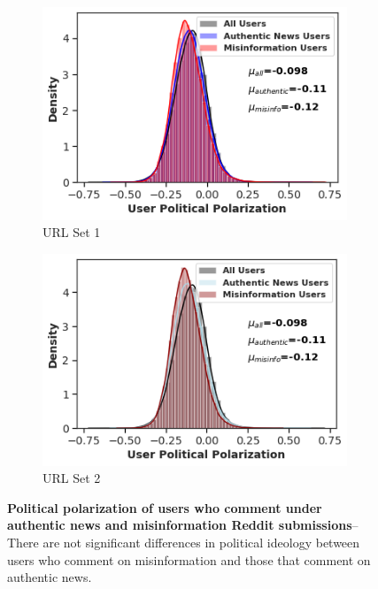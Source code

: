 \begin{figure}
\begin{subfigure}{.4\textwidth}
  \centering
  \includegraphics[width=1\linewidth]{figures/user_political_comparison.png}
      \caption{URL Set 1}
\label{fig:political-users1}
\end{subfigure}%
\begin{subfigure}{.4\textwidth}
  \centering
  \includegraphics[width=1\linewidth]{figures/user_political_comparison2.png}
      \caption{URL Set 2}
  \label{fig:political-users2}
\end{subfigure}

\caption{\textbf{Political polarization of users who comment under authentic news and misinformation Reddit submissions}-- There are not significant differences in political ideology between users who comment on misinformation and those that comment on authentic news. }
\label{fig:users-political-orientation}
\end{figure}
